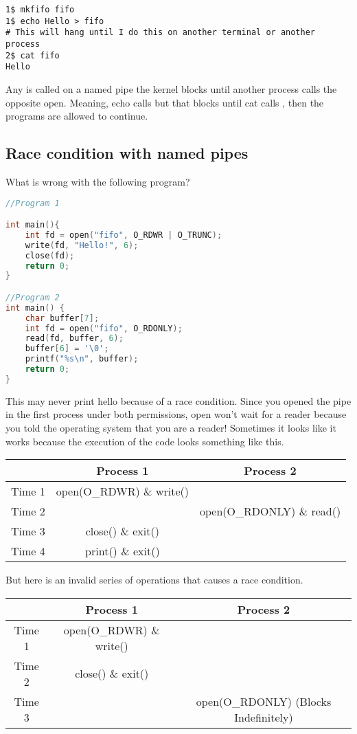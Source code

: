 \begin{verbatim}
1$ mkfifo fifo
1$ echo Hello > fifo
# This will hang until I do this on another terminal or another process
2$ cat fifo
Hello
\end{verbatim}

Any  is called on a named pipe the kernel blocks until another process calls the opposite open. Meaning, echo calls  but that blocks until cat calls , then the programs are allowed to continue.

\subsection{Race condition with named pipes}

What is wrong with the following program?

\begin{lstlisting}[language=C]
//Program 1

int main(){
    int fd = open("fifo", O_RDWR | O_TRUNC);
    write(fd, "Hello!", 6);
    close(fd);
    return 0;
}

//Program 2
int main() {
    char buffer[7];
    int fd = open("fifo", O_RDONLY);
    read(fd, buffer, 6);
    buffer[6] = '\0';
    printf("%s\n", buffer);
    return 0;
}
\end{lstlisting}

This may never print hello because of a race condition.
Since you opened the pipe in the first process under both permissions, open won't wait for a reader because you told the operating system that you are a reader!
Sometimes it looks like it works because the execution of the code looks something like this.

\begin{tabular}{|c|c|c|}
  & Process 1 & Process 2 \\ \hline
  Time 1 & open(O\_RDWR) \& write() & \\
  Time 2 & & open(O\_RDONLY) \& read() \\
  Time 3 & close() \& exit() & \\
  Time 4 & print() \& exit() & \\
\end{tabular}

But here is an invalid series of operations that causes a race condition.

\begin{tabular}{|c|c|c|}
  & Process 1 & Process 2 \\ \hline
  Time 1 & open(O\_RDWR) \& write() & \\
  Time 2 & close() \& exit() & \\
  Time 3 & & open(O\_RDONLY) (Blocks Indefinitely) \\
\end{tabular}

